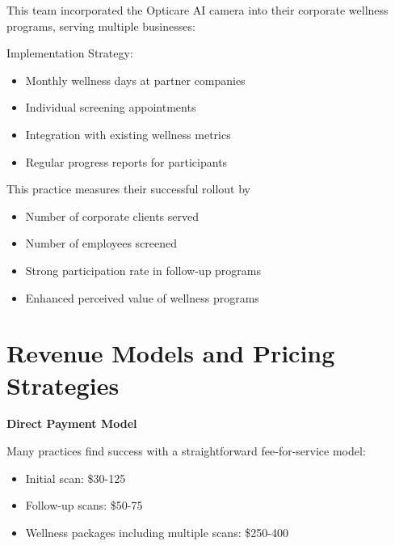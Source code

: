 \documentclass[
  Letterpaper,
]{scrbook}
\providecommand{\tightlist}{%
  \setlength{\itemsep}{0pt}\setlength{\parskip}{0pt}}\usepackage{longtable,booktabs,array}
\begin{document}
\begin{tcolorbox}[enhanced jigsaw, colback=white, colframe=quarto-callout-note-color-frame, breakable, titlerule=0mm, opacitybacktitle=0.6, bottomtitle=1mm, coltitle=black, opacityback=0, bottomrule=.15mm, toptitle=1mm, colbacktitle=quarto-callout-note-color!10!white, rightrule=.15mm, leftrule=.75mm, arc=.35mm, title=\textcolor{quarto-callout-note-color}{\faInfo}\hspace{0.5em}{Case Study 2: Corporate Wellness Program}, toprule=.15mm, left=2mm]

This team incorporated the Opticare AI camera into their corporate
wellness programs, serving multiple businesses:

Implementation Strategy:

\begin{itemize}
\tightlist
\item
  Monthly wellness days at partner companies
\item
  Individual screening appointments
\item
  Integration with existing wellness metrics
\item
  Regular progress reports for participants
\end{itemize}

This practice measures their successful rollout by

\begin{itemize}
\tightlist
\item
  Number of corporate clients served
\item
  Number of employees screened
\item
  Strong participation rate in follow-up programs
\item
  Enhanced perceived value of wellness programs
\end{itemize}

\end{tcolorbox}

\section{Revenue Models and Pricing
Strategies}\label{revenue-models-and-pricing-strategies}

\textbf{Direct Payment Model}

Many practices find success with a straightforward fee-for-service
model:

\begin{itemize}
\tightlist
\item
  Initial scan: \$30-125
\item
  Follow-up scans: \$50-75
\item
  Wellness packages including multiple scans: \$250-400
\end{itemize}
\end{document}

